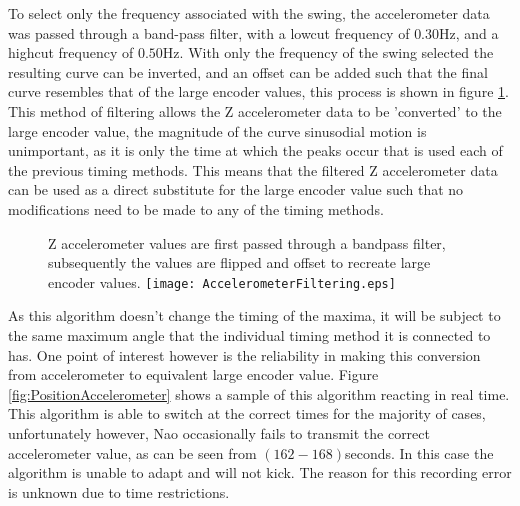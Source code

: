 \documentclass[11pt]{article}
\begin{document}
To select only the frequency associated with the swing, the accelerometer data was passed through a band-pass filter, with a lowcut frequency of $0.30$Hz, and a highcut frequency of $0.50$Hz. With only the frequency of the swing selected the resulting curve can be inverted, and an offset can be added such that the final curve resembles that of the large encoder values, this process is shown in figure \ref{fig:AccelerometerFiltering}. This method of filtering allows the Z accelerometer data to be 'converted' to the large encoder value, the magnitude of the curve sinusodial motion is unimportant, as it is only the time at which the peaks occur that is used each of the previous timing methods. This means that the filtered Z accelerometer data can be used as a direct substitute for the large encoder value such that no modifications need to be made to any of the timing methods.\\

    \begin{figure}[!htb]
        \centering
        \captionbox
             {Z accelerometer values are first passed through a bandpass filter, subsequently the values are flipped and offset to recreate large encoder values.\label{fig:AccelerometerFiltering}}
             {\texttt{[image: AccelerometerFiltering.eps]}}
    \end{figure}
    
As this algorithm doesn't change the timing of the maxima, it will be subject to the same maximum angle that the individual timing method it is connected to has. One point of interest however is the reliability in making this conversion from accelerometer to equivalent large encoder value. Figure \ref{fig:PositionAccelerometer} shows a sample of this algorithm reacting in real time. This algorithm is able to switch at the correct times for the majority of cases, unfortunately however, Nao occasionally fails to transmit the correct accelerometer value, as can be seen from $(162-168)$seconds. In this case the algorithm is unable to adapt and will not kick. The reason for this recording error is unknown due to time restrictions.\\
\end{document}
